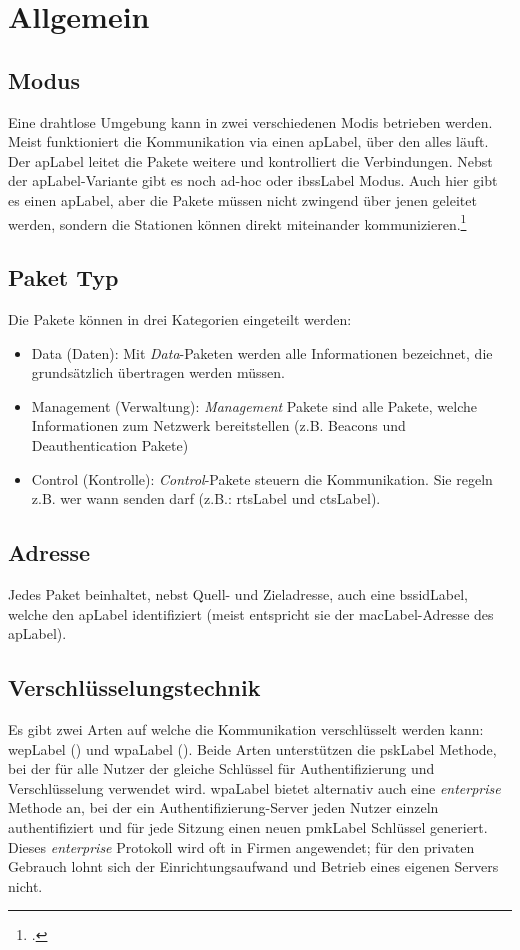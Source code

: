\chapter{Allgemein}


\section{Modus}
Eine drahtlose Umgebung kann in zwei verschiedenen Modis betrieben werden.
Meist funktioniert die Kommunikation via einen \gls{apLabel}, über den alles läuft. Der \gls{apLabel} leitet die Pakete weitere und kontrolliert die Verbindungen.
Nebst der \gls{apLabel}-Variante gibt es noch ad-hoc oder \gls{ibssLabel} Modus. Auch hier gibt es einen \gls{apLabel}, aber die Pakete müssen nicht zwingend über jenen geleitet werden, sondern die Stationen können direkt miteinander kommunizieren.\footcite[][38]{WrightCache201503}

\section{Paket Typ}
Die Pakete können in drei Kategorien eingeteilt werden:
\begin{itemize}
	\item Data (Daten): Mit \textit{Data}-Paketen werden alle Informationen bezeichnet, die grundsätzlich übertragen werden müssen.
	\item Management (Verwaltung): \textit{Management} Pakete sind alle Pakete, welche Informationen zum Netzwerk bereitstellen (z.B. Beacons und Deauthentication Pakete)
	\item Control (Kontrolle): \textit{Control}-Pakete steuern die Kommunikation. Sie regeln z.B. wer wann senden darf (z.B.: \gls{rtsLabel} und \gls{ctsLabel}).
\end{itemize}

\section{Adresse}
Jedes Paket beinhaltet, nebst Quell- und Zieladresse, auch eine \gls{bssidLabel}, welche den \gls{apLabel} identifiziert (meist entspricht sie der \gls{macLabel}-Adresse des \gls{apLabel}).


\section{Verschlüsselungstechnik}
Es gibt zwei Arten auf welche die Kommunikation verschlüsselt werden kann: \gls{wepLabel} () und \gls{wpaLabel} ().
Beide Arten unterstützen die \gls{pskLabel} Methode, bei der für alle Nutzer der gleiche Schlüssel für Authentifizierung und Verschlüsselung verwendet wird.
\gls{wpaLabel} bietet alternativ auch eine \textit{enterprise} Methode an, bei der ein Authentifizierung-Server jeden Nutzer einzeln authentifiziert und für jede Sitzung einen neuen \gls{pmkLabel} Schlüssel generiert. Dieses \textit{enterprise} Protokoll wird oft in Firmen angewendet; für den privaten Gebrauch lohnt sich der Einrichtungsaufwand und Betrieb eines eigenen Servers nicht.

